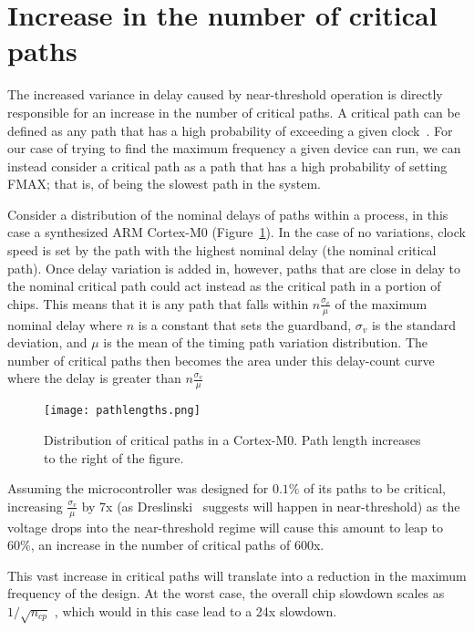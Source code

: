 \section{Increase in the number of critical paths}
\label{sec:criticalpaths}

The increased variance in delay caused by near-threshold operation is directly responsible for an increase in the number of critical paths.
A critical path can be defined as any path that has a high probability of exceeding a given clock~\cite{Wang:2004bw}.
For our case of trying to find the maximum frequency a given device can run, we can instead consider a critical path as a path that has a high probability of setting FMAX; that is, of being the slowest path in the system.
  
Consider a distribution of the nominal delays of paths within a process, in this case a synthesized ARM Cortex-M0 (Figure~\ref{fig:normal}).
In the case of no variations, clock speed is set by the path with the highest nominal delay (the nominal critical path).
Once delay variation is added in, however, paths that are close in delay to the nominal critical path could act instead as the critical path in a portion of chips.
This means that it is any path that falls within $n\frac{\sigma_v}{\mu}$ of the maximum nominal delay where $n$ is a constant that sets the guardband, $\sigma_v$ is the standard deviation, and $\mu$ is the mean of the timing path variation distribution.
The number of critical paths then becomes the area under this delay-count curve where the delay is greater than $n\frac{\sigma_v}{\mu}$
 
\begin{figure}[thpb]
    \centering
    \texttt{[image: pathlengths.png]}
    \caption{Distribution of critical paths in a Cortex-M0. Path length increases to the right of the figure.}
    \label{fig:normal}
\end{figure}
 
Assuming the microcontroller was designed for $0.1\%$ of its paths to be critical, increasing $\frac{\sigma_v}{\mu}$ by 7x (as Dreslinski~\cite{Dreslinski:2010ez} suggests will happen in near-threshold) as the voltage drops into the near-threshold regime will cause this amount  to leap to $60\%$, an increase in the number of critical paths of 600x.

This vast increase in critical paths will translate into a reduction in the maximum frequency of the design. At the worst case, the overall chip slowdown scales as $1/\sqrt{n_{cp}}$ \cite{Bowman:2002cp}, which would in this case lead to a 24x slowdown.
